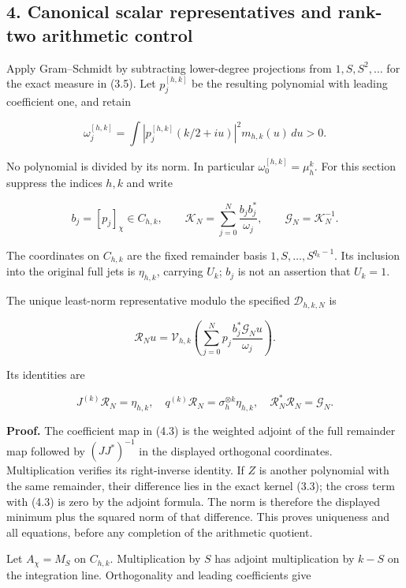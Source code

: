 \documentclass[
]{article}
\begin{document}
\subsection{4. Canonical scalar representatives and rank-two arithmetic
control}\label{canonical-scalar-representatives-and-rank-two-arithmetic-control}

Apply Gram--Schmidt by subtracting lower-degree projections from
\(1,S,S^2,\ldots\) for the exact measure in (3.5). Let \(p_j^{[h,k]}\)
be the resulting polynomial with leading coefficient one, and retain

\[\omega_j^{[h,k]}=\int |p_j^{[h,k]}(k/2+iu)|^2m_{h,k}(u)\,du>0.\tag{4.1}\]

No polynomial is divided by its norm. In particular
\(\omega_0^{[h,k]}=\mu_h^k\). For this section suppress the indices
\(h,k\) and write

\[b_j=[p_j]_\chi\in C_{h,k},\qquad
\mathcal K_N=\sum_{j=0}^N\frac{b_jb_j^*}{\omega_j},\qquad
\mathcal G_N=\mathcal K_N^{-1}.\tag{4.2}\]

The coordinates on \(C_{h,k}\) are the fixed remainder basis
\(1,S,\ldots,S^{q_k-1}\). Its inclusion into the original full jets is
\(\eta_{h,k}\), carrying \(U_k\); \(b_j\) is not an assertion that
\(U_k=1\).

The unique least-norm representative modulo the specified
\(\mathcal D_{h,k,N}\) is

\[\boxed{\mathcal R_Nu=\mathcal V_{h,k}\left(
\sum_{j=0}^Np_j\frac{b_j^*\mathcal G_Nu}{\omega_j}\right).}\tag{4.3}\]

Its identities are

\[J^{(k)}\mathcal R_N=\eta_{h,k},\quad
q^{(k)}\mathcal R_N=\sigma_h^{\otimes k}\eta_{h,k},\quad
\mathcal R_N^*\mathcal R_N=\mathcal G_N.\tag{4.4}\]

\textbf{Proof.} The coefficient map in (4.3) is the weighted adjoint of
the full remainder map followed by \((JJ^*)^{-1}\) in the displayed
orthogonal coordinates. Multiplication verifies its right-inverse
identity. If \(Z\) is another polynomial with the same remainder, their
difference lies in the exact kernel (3.3); the cross term with (4.3) is
zero by the adjoint formula. The norm is therefore the displayed minimum
plus the squared norm of that difference. This proves uniqueness and all
equations, before any completion of the arithmetic quotient.

Let \(A_\chi=M_S\) on \(C_{h,k}\). Multiplication by \(S\) has adjoint
multiplication by \(k-S\) on the integration line. Orthogonality and
leading coefficients give
\end{document}
